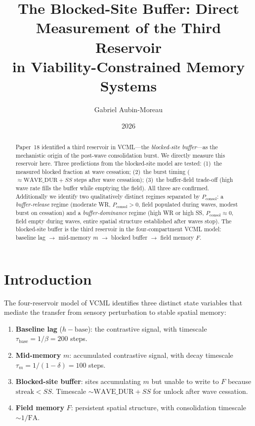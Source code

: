 \documentclass[11pt]{article}
\title{The Blocked-Site Buffer: Direct Measurement of the Third Reservoir\\
       in Viability-Constrained Memory Systems}
\author{Gabriel Aubin-Moreau}
\date{2026}
\begin{document}
\maketitle

\begin{abstract}
Paper~18 identified a third reservoir in VCML---the \emph{blocked-site buffer}---as the
mechanistic origin of the post-wave consolidation burst.
We directly measure this reservoir here.
Three predictions from the blocked-site model are tested:
(1)~the measured blocked fraction at wave cessation;
(2)~the burst timing ($\approx \mathrm{WAVE\_DUR} + SS$ steps after wave cessation);
(3)~the buffer-field trade-off (high wave rate fills the buffer while emptying the field).
All three are confirmed.
Additionally we identify two qualitatively distinct regimes separated by $P_{\mathrm{consol}}$:
a \emph{buffer-release} regime (moderate WR, $P_{\mathrm{consol}} > 0$, field populated during waves,
modest burst on cessation) and a \emph{buffer-dominance} regime
(high WR or high SS, $P_{\mathrm{consol}} \approx 0$, field empty during waves,
entire spatial structure established after waves stop).
The blocked-site buffer is the third reservoir in the four-compartment VCML model:
baseline lag $\to$ mid-memory $m$ $\to$ blocked buffer $\to$ field memory $F$.
\end{abstract}

\section{Introduction}

The four-reservoir model of VCML identifies three distinct state variables
that mediate the transfer from sensory perturbation to stable spatial memory:
\begin{enumerate}
  \item \textbf{Baseline lag} ($h - \mathrm{base}$):
    the contrastive signal, with timescale $\tau_{\mathrm{base}} = 1/\beta = 200$ steps.
  \item \textbf{Mid-memory} $m$:
    accumulated contrastive signal, with decay timescale $\tau_m = 1/(1-\delta) = 100$ steps.
  \item \textbf{Blocked-site buffer}:
    sites accumulating $m$ but unable to write to $F$ because $\mathrm{streak} < SS$.
    Timescale $\sim \mathrm{WAVE\_DUR} + SS$ for unlock after wave cessation.
  \item \textbf{Field memory} $F$:
    persistent spatial structure, with consolidation timescale $\sim 1/\mathrm{FA}$.
\end{enumerate}
\end{document}
